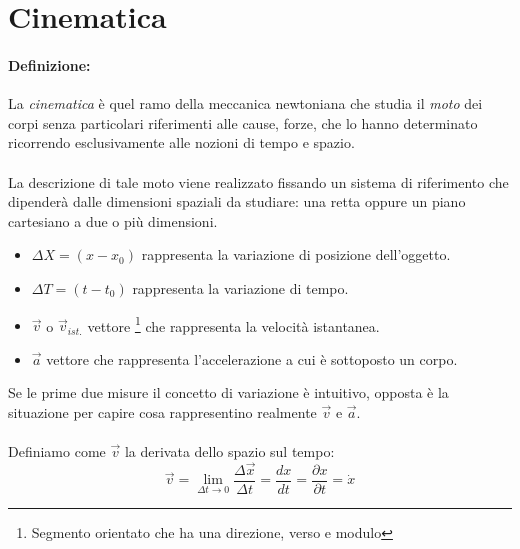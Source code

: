 \section{Cinematica}

\paragraph{Definizione:}

La \textit{cinematica} è quel ramo della meccanica newtoniana che studia il \textit{moto} dei corpi senza particolari riferimenti alle cause, forze, che lo hanno determinato ricorrendo esclusivamente alle nozioni di tempo e spazio.

\paragraph{}
La descrizione di tale moto viene realizzato fissando un sistema di riferimento che dipenderà dalle dimensioni spaziali da studiare: una retta oppure un piano cartesiano a due o più dimensioni.

 
\begin{itemize}

    \item $\Delta X = (x - x_0) $ rappresenta la variazione di posizione dell'oggetto.
    \item $\Delta T = (t - t_0) $ rappresenta la variazione di tempo.
    \item $\vec{v} $ o $ \vec{v}_{ist.} $  vettore \footnote{\label{vet:vettore} Segmento orientato che ha una direzione, verso e modulo} che rappresenta la velocità istantanea.
    \item $\vec{a} $ vettore che rappresenta l'accelerazione a cui è sottoposto un corpo.
    
\end{itemize}

Se le prime due misure il concetto di variazione è intuitivo, opposta è la situazione per capire cosa rappresentino realmente $ \vec{v} $ e $ \vec{a} $.

\paragraph{}

Definiamo come $ \vec{v} $ la derivata dello spazio sul tempo:
\begin{equation}
\vec{v} = \lim_{\Delta t\to0}\frac{\Delta\vec{ x}}{\Delta t} = \frac{dx}{dt} = \frac{\partial x}{\partial t} = \dot{x}
\label{velocitaLineare}
\end{equation}

